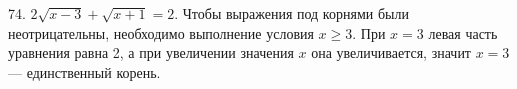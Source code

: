 74. $2\sqrt{x-3}+\sqrt{x+1}=2.$ Чтобы выражения под корнями были неотрицательны, необходимо выполнение условия $x\geqslant3.$ При $x=3$ левая часть уравнения равна 2, а при увеличении значения $x$ она увеличивается, значит $x=3$ --- единственный корень.\\
